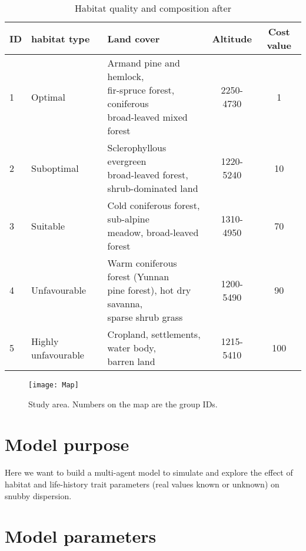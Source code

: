 \begin{table}[ht]
 	\centering
 	\caption{Habitat quality and composition after \citet{Li2017}}
 	\label{tab:habitats}
 	\begin{tabular}{lllcc}
 		\hline
 		ID & habitat type & Land cover & Altitude & Cost value \\
 		\hline
 		 1&Optimal & \makecell[l]{Armand pine and hemlock,\\ fir-spruce forest, coniferous \\broad-leaved mixed forest} & 2250-4730 & 1 \\
 		 2&Suboptimal  & \makecell[l]{Sclerophyllous evergreen \\broad-leaved forest,\\ shrub-dominated land} & 1220-5240 & 10 \\
 		 3&Suitable &  \makecell[l]{Cold coniferous forest, sub-alpine\\ meadow, broad-leaved forest} & 1310-4950 & 70 \\
 		 4&Unfavourable  & \makecell[l]{Warm coniferous forest (Yunnan \\pine forest), hot dry savanna, \\sparse shrub grass} & 1200-5490 &90 \\
 		 5&Highly unfavourable  & \makecell[l]{Cropland, settlements, water body,\\ barren land} & 1215-5410 & 100 \\
 		\hline
 	\end{tabular}
 \end{table}
 
 
 \begin{figure}[ht]
 	\centering
 	\texttt{[image: Map]}
 	\caption{Study area. Numbers on the  map are the group IDs.}
 	\label{fig:studyarea}
 \end{figure}

\section{Model purpose}
Here we want to build a multi-agent model to simulate and explore the effect of habitat and life-history trait 
parameters (real values known or unknown) on snubby dispersion.

\section{Model parameters}

